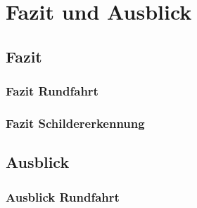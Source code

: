 \section{Fazit und Ausblick}
\label{sec:fazit}
\subsection{Fazit}
\subsubsection{Fazit Rundfahrt}
\subsubsection{Fazit Schildererkennung}
\subsection{Ausblick}
\subsubsection{Ausblick Rundfahrt}
